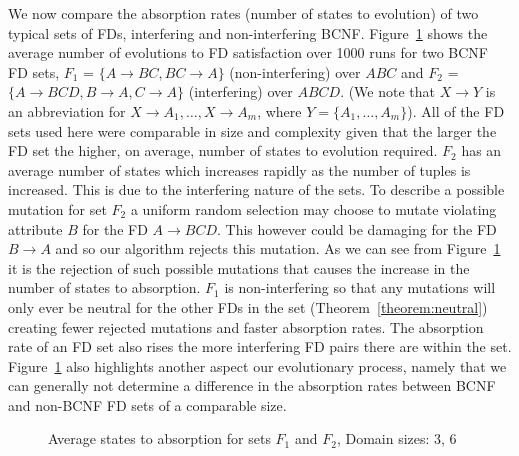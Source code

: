 We now compare the absorption rates (number of states to
evolution) of two typical sets of FDs, 
interfering and non-interfering BCNF. Figure~\ref{graph:16_82}
shows the average number of evolutions to FD satisfaction over 1000 runs for
two BCNF FD sets, $F_1$ = $\{ A \to BC, BC \to A \}$ (non-interfering)
over $ABC$ and 
$F_2$ = $\{ A \to BCD, B \to A, C \to A \}$ (interfering) over $ABCD$.
 (We note that $X \to Y$ is an abbreviation for $X \to A_1, \ldots, X \to A_m$,
where $Y = \{A_1, \ldots, A_m \}$).
  All of the
FD sets used here were comparable in size and complexity given that the larger
the FD set the higher, on average, number of states to evolution required.
$F_2$ has an average number of states which increases
rapidly as the number of tuples is increased. This is due to the
interfering nature of the sets. To describe a possible mutation
for set $F_2$ a uniform random selection may choose to mutate violating
attribute $B$ for the FD $A \to BCD$. This however could be damaging for
the FD $B \to A$ and so our algorithm rejects this mutation. As we
can see from Figure~\ref{graph:16_82} it is the rejection of such
possible mutations that causes the increase in the number of states
to absorption. $F_1$ is non-interfering so that
any mutations will only ever be neutral for the other FDs in the set 
(Theorem~\ref{theorem:neutral}) creating fewer rejected mutations
and faster absorption rates. The absorption rate of an FD set also
rises the more interfering FD pairs there are within
the set.
Figure~\ref{graph:16_82}  also highlights another
aspect our evolutionary process, namely that we can generally not determine
 a difference in the 
absorption rates between BCNF and non-BCNF FD sets of a comparable
size. \\


\begin{figure}
\centerline{}
\caption{\label{graph:16_82}\scriptsize{Average states to absorption for sets $F_1$ and $F_2$, Domain sizes: 3, 6 }}
\end{figure}

